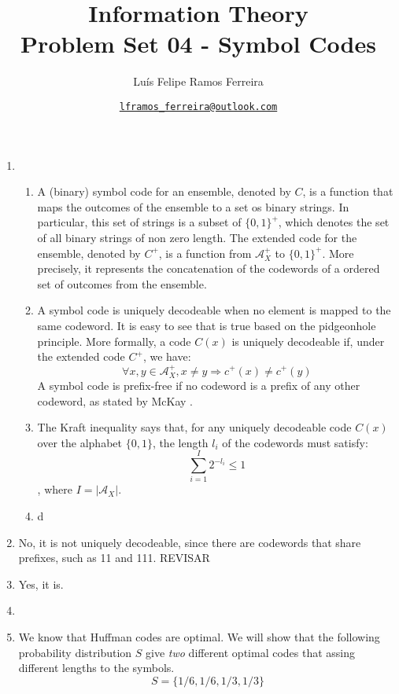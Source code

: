 \documentclass{article}
\title{Information Theory \\ \large Problem Set 04 - Symbol Codes}
\author{Luís Felipe Ramos Ferreira}
\date{\href{mailto:lframos\_ferreira@outlook.com}{\texttt{lframos\_ferreira@outlook.com}}
}
\begin{document}
\maketitle

\begin{enumerate}
	\item \begin{enumerate}
		      \item A (binary) symbol code for an ensemble, denoted by \(C\), is a function that maps the outcomes of the ensemble to a set os binary strings. In particular, this set of strings is a subset of \(\{0, 1\}^+\), which denotes the set of all binary strings of non zero length. The extended code for the ensemble, denoted by \(C^+\), is a function from \(\mathcal{A}_X^+\) to \(\{0, 1\}^+\). More precisely, it represents the concatenation of the codewords of a ordered set of outcomes from the ensemble.
		      \item A symbol code is uniquely decodeable when no element is mapped to the same codeword. It is easy to see that is true based on the pidgeonhole principle. More formally, a code \(C(x)\) is uniquely decodeable if, under the extended code \(C^+\), we have:
		            \[\forall x, y \in \mathcal{A}_X^+, x \neq y \Rightarrow c^+(x) \neq c^+(y)\]
		            A symbol code is prefix-free if no codeword is a prefix of any other codeword, as stated by McKay \cite{MacKay}.
		      \item The Kraft inequality says that, for any uniquely decodeable code \(C(x)\) over the alphabet \(\{0,1\}\), the length \(l_i\) of the codewords must satisfy:
		            \[\sum_{i=1}^{I}2^{-l_i} \leq 1\],
		            where \(I = |\mathcal{A}_X|\).
		      \item d
	      \end{enumerate}

	\item No, it is not uniquely decodeable, since there are codewords that share prefixes, such as 11 and 111. REVISAR
	\item Yes, it is.
	\item \begin{enumerate}

	      \end{enumerate}
	\item We know that Huffman codes are optimal. We will show that the following probability distribution \(S\) give \textit{two} different optimal codes that assing different lengths to the symbols.
	      \[S = \{1/6,1/6,1/3,1/3\}\]


\end{enumerate}
\end{document}
